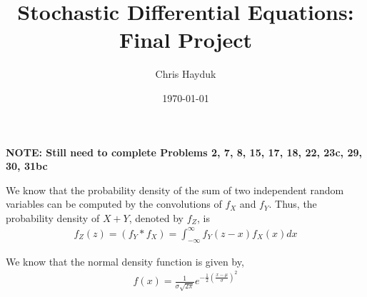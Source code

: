 \documentclass[12pt]{article}
\newenvironment{problem}[2][Problem]{\begin{trivlist}
\item[\hskip \labelsep {\bfseries #1}\hskip \labelsep {\bfseries #2.}]}{\end{trivlist}}
\begin{document}
\title{Stochastic Differential Equations: Final Project}

\author{Chris Hayduk}
\date{\today}

\maketitle

\textbf{NOTE: Still need to complete Problems 2, 7, 8, 15, 17, 18, 22, 23c, 29, 30, 31bc}

\begin{problem}{1}
\end{problem}

We know that the probability density of the sum of two independent random variables can be computed by the convolutions of $f_X$ and $f_Y$. Thus, the probability density of $X + Y$, denoted by $f_Z$, is
\begin{align}
f_Z(z) = (f_Y*f_X) = \int_{-\infty}^{\infty}  f_Y(z - x)f_X(x) dx
\end{align}

We know that the normal density function is given by,
\begin{align*}
f(x) = \frac{1}{\sigma\sqrt{2\pi}} e^{-\frac{1}{2}\left(\frac{x-\mu}{\sigma}\right)^2}
\end{align*}
\end{document}

